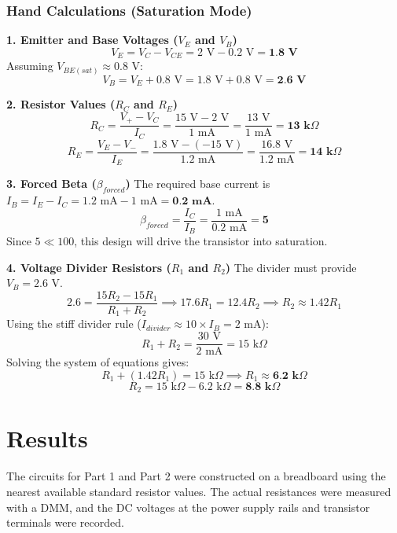 \subsubsection*{Hand Calculations (Saturation Mode)}
\textbf{1. Emitter and Base Voltages ($V_E$ and $V_B$)}
\[ V_E = V_C - V_{CE} = 2 \text{ V} - 0.2 \text{ V} = \textbf{1.8 V} \]
Assuming $V_{BE(sat)} \approx 0.8 \text{ V}$:
\[ V_B = V_E + 0.8 \text{ V} = 1.8 \text{ V} + 0.8 \text{ V} = \textbf{2.6 V} \]

\textbf{2. Resistor Values ($R_C$ and $R_E$)}
\[ R_{C} = \frac{V_{+} - V_{C}}{I_{C}} = \frac{15 \text{ V} - 2 \text{ V}}{1 \text{ mA}} = \frac{13 \text{ V}}{1 \text{ mA}} = \textbf{13 k}\Omega \]
\[ R_{E} = \frac{V_{E} - V_{-}}{I_{E}} = \frac{1.8 \text{ V} - (-15 \text{ V})}{1.2 \text{ mA}} = \frac{16.8 \text{ V}}{1.2 \text{ mA}} = \textbf{14 k}\Omega \]

\textbf{3. Forced Beta ($\beta_{forced}$)}
The required base current is $I_B = I_E - I_C = 1.2 \text{ mA} - 1 \text{ mA} = \textbf{0.2 mA}$.
\[ \beta_{forced} = \frac{I_C}{I_B} = \frac{1 \text{ mA}}{0.2 \text{ mA}} = \textbf{5} \]
Since $5 \ll 100$, this design will drive the transistor into saturation.

\textbf{4. Voltage Divider Resistors ($R_1$ and $R_2$)}
The divider must provide $V_B = 2.6 \text{ V}$.
\[ 2.6 = \frac{15R_2 - 15R_1}{R_1 + R_2} \implies 17.6 R_1 = 12.4 R_2 \implies R_2 \approx 1.42 R_1 \]
Using the stiff divider rule ($I_{divider} \approx 10 \times I_B = 2 \text{ mA}$):
\[ R_1 + R_2 = \frac{30 \text{ V}}{2 \text{ mA}} = 15 \text{ k}\Omega \]
Solving the system of equations gives:
\[ R_1 + (1.42 R_1) = 15 \text{ k}\Omega \implies R_1 \approx \textbf{6.2 k}\Omega \]
\[ R_2 = 15 \text{ k}\Omega - 6.2 \text{ k}\Omega = \textbf{8.8 k}\Omega \]

\section*{Results}
The circuits for Part 1 and Part 2 were constructed on a breadboard using the nearest available standard resistor values. The actual resistances were measured with a DMM, and the DC voltages at the power supply rails and transistor terminals were recorded.

